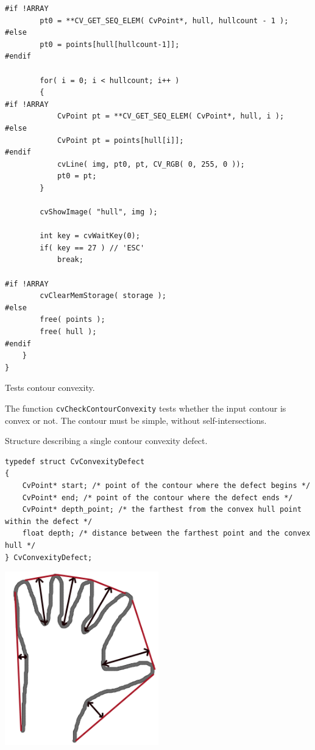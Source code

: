 \begin{lstlisting}
#if !ARRAY
        pt0 = **CV_GET_SEQ_ELEM( CvPoint*, hull, hullcount - 1 );
#else
        pt0 = points[hull[hullcount-1]];
#endif

        for( i = 0; i < hullcount; i++ )
        {
#if !ARRAY
            CvPoint pt = **CV_GET_SEQ_ELEM( CvPoint*, hull, i );
#else
            CvPoint pt = points[hull[i]];
#endif
            cvLine( img, pt0, pt, CV_RGB( 0, 255, 0 ));
            pt0 = pt;
        }

        cvShowImage( "hull", img );

        int key = cvWaitKey(0);
        if( key == 27 ) // 'ESC'
            break;

#if !ARRAY
        cvClearMemStorage( storage );
#else
        free( points );
        free( hull );
#endif
    }
}
\end{lstlisting}

\label{CheckContourConvexity}

Tests contour convexity.


\begin{description}
\end{description}

The function \texttt{cvCheckContourConvexity} tests whether the input contour is convex or not. The contour must be simple, without self-intersections.

\label{CvConvexityDefect}

Structure describing a single contour convexity defect.

\begin{lstlisting}
typedef struct CvConvexityDefect
{
    CvPoint* start; /* point of the contour where the defect begins */
    CvPoint* end; /* point of the contour where the defect ends */
    CvPoint* depth_point; /* the farthest from the convex hull point within the defect */
    float depth; /* distance between the farthest point and the convex hull */
} CvConvexityDefect;
\end{lstlisting}

\includegraphics[width=0.5\textwidth]{pics/defects.png}

